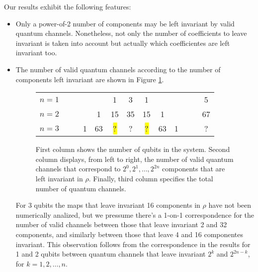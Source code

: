 \documentclass[11pt,dvipsnames]{article}
\begin{document}
Our results exhibit the following features:
\begin{itemize}
\item Only a power-of-2 number of components may be left invariant by valid
			quantum channels. Nonetheless,
			not only the number of 
			coefficients to leave invariant is taken into account but actually
			which coefficientes are left invariant too.

\item 
The number of valid quantum channels according to the number of components
left invariant are shown in Figure \ref{fig:CCs-by-components}.

\begin{figure}[H]
	\centering
		\begin{tabular}{>{$n=}l<{$\hfill}*{12}{c}}
			1 &&&&&1&3&1&&&&&5\\
			2 &&&&1&15&35&15&1&&&&67\\
			3 &&&1&63&\colorbox{Yellow}{?}&?&\colorbox{Yellow}{?}&
				\colorbox{RedOrange}{63}&1&&&?
			\end{tabular}
			\caption{First column shows the number of qubits in the system. 
							Second column displays, from left to right, the number of valid 
							quantum channels that correspond to 
							$2^0, 2^1, \ldots, 2^{2n}$ components that are 
							left invariant in $\rho$. Finally, third column specifies the 
							total number of quantum channels.}
			\label{fig:CCs-by-components}
\end{figure} 

For 3 qubits the maps that leave invariant 16 components in $\rho$
have not been numerically analized, but we pressume there's a 
1-on-1 correspondence for the number of valid channels between those that leave
invariant 2 and 32 components, and similarly between those that leave 4 and 16
componentes invariant. This observation follows 
from the correspondence in the results for 1 and 2 qubits 
between quantum channels that leave invariant $2^k$ and $2^{2n-k}$, for 
$k=1, 2, \ldots, n$.
		


\end{itemize}
\end{document}

